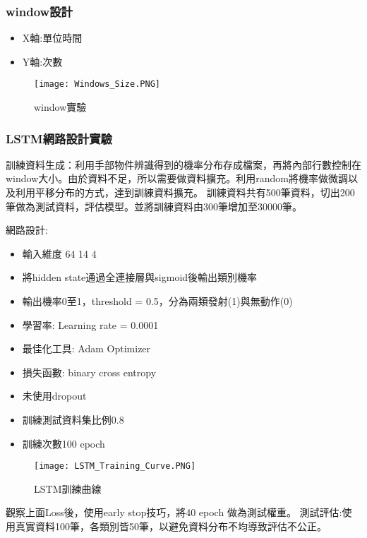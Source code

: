 \subsubsection{window設計}

\begin{itemize}
\item X軸:單位時間
\item Y軸:次數
\end{itemize}

\begin{figure}[H]
    \centering
    \texttt{[image: Windows\_Size.PNG]}
    \caption{window實驗}
    \label{fig:window實驗}
\end{figure}

\subsubsection{LSTM網路設計實驗}

訓練資料生成：利用手部物件辨識得到的機率分布存成檔案，再將內部行數控制在window大小。由於資料不足，所以需要做資料擴充。利用random將機率做微調以及利用平移分布的方式，達到訓練資料擴充。
訓練資料共有500筆資料，切出200筆做為測試資料，評估模型。並將訓練資料由300筆增加至30000筆。

網路設計:
\begin{itemize}
\item 輸入維度  64 14 4
\item 將hidden state通過全連接層與sigmoid後輸出類別機率
\item 輸出機率0至1，threshold = 0.5，分為兩類發射(1)與無動作(0)
\item 學習率: Learning rate = 0.0001
\item 最佳化工具: Adam Optimizer
\item 損失函數: binary cross entropy
\item 未使用dropout
\item 訓練測試資料集比例0.8
\item 訓練次數100 epoch
\end{itemize}

\begin{figure}[H]
    \centering
    \texttt{[image: LSTM\_Training\_Curve.PNG]}
    \caption{LSTM訓練曲線}
    \label{fig:LSTM訓練曲線}
\end{figure}

觀察上面Loss後，使用early stop技巧，將40 epoch 做為測試權重。
測試評估:使用真實資料100筆，各類別皆50筆，以避免資料分布不均導致評估不公正。

